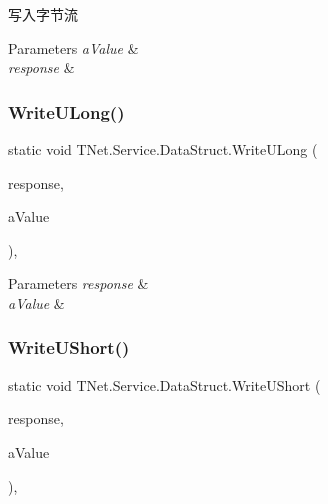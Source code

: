写入字节流 


\begin{DoxyParams}{Parameters}
{\em a\+Value} & \\
\hline
{\em response} & \\
\hline
\end{DoxyParams}
\mbox{\label{class_t_net_1_1_service_1_1_data_struct_acc6877deb014858e06f99a40b67645ee}} 
\subsubsection{\texorpdfstring{Write\+U\+Long()}{WriteULong()}}
{\footnotesize\ttfamily static void T\+Net.\+Service.\+Data\+Struct.\+Write\+U\+Long (\begin{DoxyParamCaption}\item[{\mbox{\hyperlink{class_t_net_1_1_service_1_1_base_game_response}{Base\+Game\+Response}}}]{response,  }\item[{U\+Int64}]{a\+Value }\end{DoxyParamCaption})\hspace{0.3cm}{\ttfamily [static]}, {\ttfamily [protected]}}






\begin{DoxyParams}{Parameters}
{\em response} & \\
\hline
{\em a\+Value} & \\
\hline
\end{DoxyParams}
\mbox{\label{class_t_net_1_1_service_1_1_data_struct_a03184827c8d0cf7dfa1b2ed11a2713ea}} 
\subsubsection{\texorpdfstring{Write\+U\+Short()}{WriteUShort()}}
{\footnotesize\ttfamily static void T\+Net.\+Service.\+Data\+Struct.\+Write\+U\+Short (\begin{DoxyParamCaption}\item[{\mbox{\hyperlink{class_t_net_1_1_service_1_1_base_game_response}{Base\+Game\+Response}}}]{response,  }\item[{U\+Int16}]{a\+Value }\end{DoxyParamCaption})\hspace{0.3cm}{\ttfamily [static]}, {\ttfamily [protected]}}



